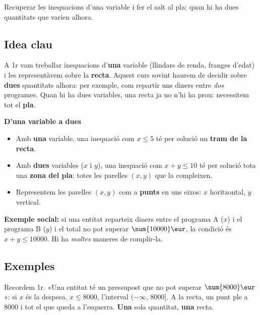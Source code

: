 %
{Recuperar les inequacions d'una variable i fer el salt al pla: quan hi ha dues quantitats que varien alhora.}

\subsection{Idea clau}

A 1r vam treballar inequacions d'\textbf{una} variable (llindars de renda, franges
d'edat) i les representàvem sobre la \textbf{recta}. Aquest curs sovint haurem de
decidir sobre \textbf{dues} quantitats alhora: per exemple, com repartir uns diners
entre \emph{dos} programes. Quan hi ha dues variables, una recta ja no n'hi ha prou:
necessitem tot el \textbf{pla}.

\begin{idea}
\textbf{D'una variable a dues}
\begin{itemize}[leftmargin=1.4em, itemsep=2pt]
  \item Amb \textbf{una} variable, una inequació com $x\le 5$ té per solució un
        \textbf{tram de la recta}.
  \item Amb \textbf{dues} variables ($x$ i $y$), una inequació com $x+y\le 10$ té per
        solució tota una \textbf{zona del pla}: totes les parelles $(x,y)$ que la
        compleixen.
  \item Representem les parelles $(x,y)$ com a \textbf{punts} en uns eixos: $x$
        horitzontal, $y$ vertical.
\end{itemize}
\textbf{Exemple social:} si una entitat reparteix diners entre el programa A ($x$) i
el programa B ($y$) i el total no pot superar $\num{10000}\eur$, la condició és
$x+y\le\num{10000}$. Hi ha \emph{moltes} maneres de complir-la.
\end{idea}

\subsection{Exemples}

\begin{exemple}
Recordem 1r. «Una entitat té un pressupost que no pot superar $\num{8000}\eur$»: si
$x$ és la despesa, $x\le\num{8000}$, l'interval $(-\infty,\,\num{8000}]$. A la recta,
un punt ple a $\num{8000}$ i tot el que queda a l'esquerra. \textbf{Una} sola
quantitat, \textbf{una} recta.
\end{exemple}

